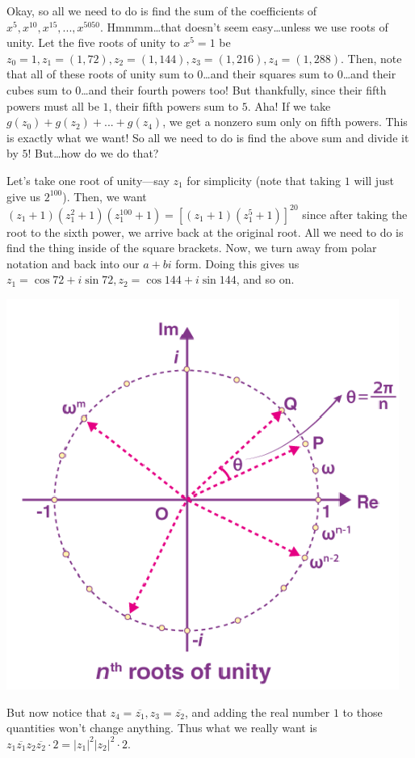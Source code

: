 \documentclass{article}
\begin{document}
Okay, so all we need to do is find the sum of the coefficients of $x^5,x^{10},x^{15},...,x^{5050}$. Hmmmm…that doesn’t seem easy…unless we use roots of unity. Let the five roots of unity to $x^5=1$ be $z_0=1, z_1=(1,72), z_2=(1,144), z_3=(1,216), z_4=(1,288)$. Then, note that all of these roots of unity sum to $0$…and their squares sum to $0$…and their cubes sum to $0$…and their fourth powers too! But thankfully, since their fifth powers must all be $1$, their fifth powers sum to $5$. Aha! If we take $g(z_0)+g(z_2)+...+g(z_4)$, we get a nonzero sum only on fifth powers. This is exactly what we want! So all we need to do is find the above sum and divide it by $5$! But…how do we do that? 
	
Let’s take one root of unity—say $z_1$ for simplicity (note that taking $1$ will just give us $2^100$). Then, we want $(z_1+1)(z_1^2+1)(z_1^{100}+1)=[(z_1+1)(z_1^5+1)]^20$ since after taking the root to the sixth power, we arrive back at the original root. All we need to do is find the thing inside of the square brackets. Now, we turn away from polar notation and back into our $a+bi$ form. Doing this gives us $z_1=\cos 72+i\sin 72, z_2=\cos 144+i\sin 144$, and so on. 
\begin{center}
    \includegraphics[scale=0.7]{images/root1.png}
\end{center}
But now notice that $z_4=\overline{z_1}, z_3=\overline{z_2}$, and adding the real number $1$ to those quantities won't change anything. Thus what we really want is 
$z_1\overline{z_1}z_2\overline{z_2}\cdot 2=|z_1|^2|z_2|^2\cdot 2$. 
\end{document}
